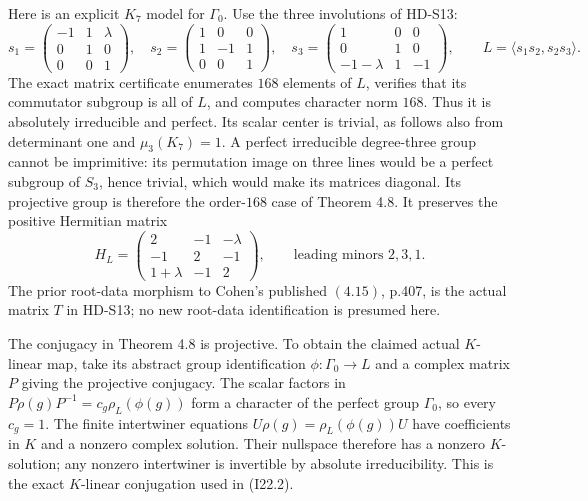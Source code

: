 Here is an explicit $K_7$ model for $\Gamma_0$.
Use the three involutions of HD-S13:
\[
 s_1=\begin{pmatrix}-1&1&\lambda\\0&1&0\\0&0&1\end{pmatrix},\quad
 s_2=\begin{pmatrix}1&0&0\\1&-1&1\\0&0&1\end{pmatrix},\quad
 s_3=\begin{pmatrix}1&0&0\\0&1&0\\-1-\lambda&1&-1\end{pmatrix},
 \qquad L=\langle s_1s_2,s_2s_3\rangle.                       \tag{I22.5}
\]
The exact matrix certificate enumerates $168$ elements
of $L$, verifies that its commutator subgroup is all of $L$,
and computes character norm $168$. Thus it is absolutely
irreducible and perfect. Its scalar center is trivial,
as follows also from determinant one and $\mu_3(K_7)=1$.
A perfect irreducible degree-three group cannot be
imprimitive: its permutation image on three lines would
be a perfect subgroup of $S_3$, hence trivial, which
would make its matrices diagonal. Its projective group
is therefore the order-$168$ case of Theorem 4.8.
It preserves the positive Hermitian matrix
\[
 H_L=\begin{pmatrix}2&-1&-\lambda\\-1&2&-1\\1+\lambda&-1&2\end{pmatrix},
 \qquad \text{leading minors }2,3,1.                         \tag{I22.6}
\]
The prior root-data morphism to Cohen's published
$(4.15)$, p.407, is the actual matrix $T$ in HD-S13;
no new root-data identification is presumed here.

The conjugacy in Theorem 4.8 is projective. To obtain the
claimed actual $K$-linear map, take its abstract group
identification $\phi:\Gamma_0\to L$ and a complex matrix
$P$ giving the projective conjugacy. The scalar factors in
$P\rho(g)P^{-1}=c_g\rho_L(\phi(g))$ form a character
of the perfect group $\Gamma_0$, so every $c_g=1$.
The finite intertwiner equations
$U\rho(g)=\rho_L(\phi(g))U$ have coefficients in $K$
and a nonzero complex solution. Their nullspace therefore
has a nonzero $K$-solution; any nonzero intertwiner is
invertible by absolute irreducibility. This is the exact
$K$-linear conjugation used in (I22.2).

